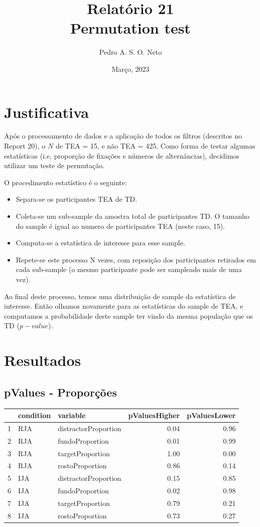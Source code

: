 \documentclass{article}
\title{Relatório 21 \\ Permutation test}
\author{Pedro A. S. O. Neto}
\date{Março, 2023}
\begin{document}
\maketitle

\section{Justificativa}

Após o processamento de dados e a aplicação de todos os filtros (descritos no Report 20), o $N$ de TEA = 15, e não TEA = 425.
Como forma de testar algumas estatísticas (i.e, proporção de fixações e números de alternâncias), decidimos utilizar um teste de permutação.

O procedimento estatístico é o seguinte:
\begin{itemize}
  \item Separa-se os participantes TEA de TD.
  \item Coleta-se um sub-sample da amostra total de participantes TD. O tamanho do sample é igual ao numero de participantes TEA (neste caso, 15).
  \item Computa-se a estatística de interesse para esse sample.
  \item Repete-se este processo N vezes, com reposição dos participantes retirados em cada sub-sample (o mesmo participante pode ser sampleado mais de uma vez).
\end{itemize}

Ao final deste processo, temos uma distribuição de sample da estatística de interesse. Então olhamos novamente para as estatísticas do sample de TEA, e computamos a probabilidade deste sample ter vindo da mesma população que os TD ($p-value$).

\section{Resultados}

\subsection{pValues - Proporções}

  \begin{table}[ht]
  \centering
  \begin{tabular}{rllrr}
    \hline
   & condition & variable & pValuesHigher & pValuesLower \\ 
    \hline
  1 & RJA & distractorProportion & 0.04 & 0.96 \\ 
    2 & RJA & fundoProportion & 0.01 & 0.99 \\ 
    3 & RJA & targetProportion & 1.00 & 0.00 \\ 
    4 & RJA & rostoProportion & 0.86 & 0.14 \\ 
    5 & IJA & distractorProportion & 0.15 & 0.85 \\ 
    6 & IJA & fundoProportion & 0.02 & 0.98 \\ 
    7 & IJA & targetProportion & 0.79 & 0.21 \\ 
    8 & IJA & rostoProportion & 0.73 & 0.27 \\ 
     \hline
  \end{tabular}
  \end{table}
\end{document}
